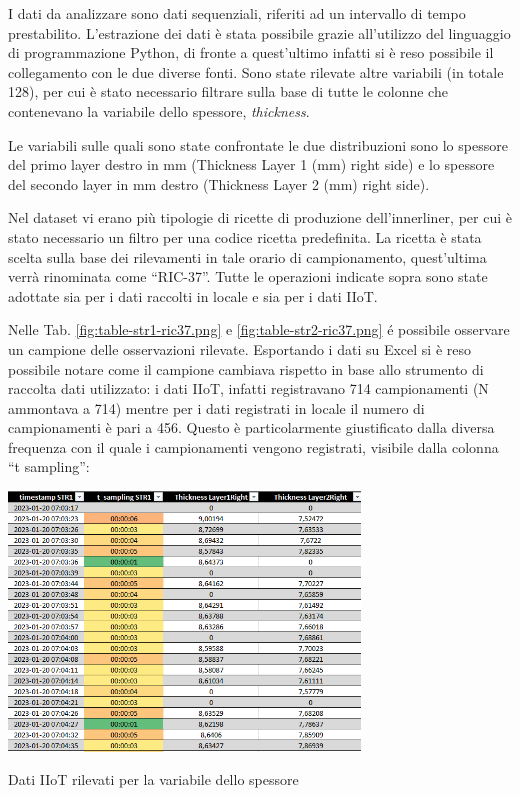 I dati da analizzare sono dati sequenziali, riferiti ad un intervallo di tempo prestabilito.
L'estrazione dei dati è stata possibile grazie all'utilizzo del linguaggio di programmazione Python, di fronte a quest'ultimo infatti si è reso possibile il collegamento con le due diverse fonti.
Sono state rilevate altre variabili (in totale 128), per cui è stato necessario filtrare sulla base di tutte le colonne che contenevano la variabile dello spessore, \textit{thickness}.

Le variabili sulle quali sono state confrontate le due distribuzioni sono lo spessore del primo layer destro in mm (Thickness Layer 1 (mm) right side) e lo spessore del secondo layer in mm destro (Thickness Layer 2 (mm) right side).

Nel dataset vi erano più tipologie di ricette di produzione dell'innerliner, per cui è stato necessario un filtro per una codice ricetta predefinita. 
La ricetta è stata scelta sulla base dei rilevamenti in tale orario di campionamento, quest'ultima verrà rinominata come ``RIC-37''.
Tutte le operazioni indicate sopra sono state adottate sia per i dati raccolti in locale e sia per i dati IIoT.


Nelle Tab. \ref{fig:table-str1-ric37.png}  e \ref{fig:table-str2-ric37.png} é possibile osservare un campione delle osservazioni rilevate.
Esportando i dati su Excel si è reso possibile notare come il campione cambiava rispetto in base allo strumento di raccolta dati utilizzato: i dati IIoT, infatti registravano 714 campionamenti (N ammontava a 714) mentre per i dati registrati in locale il numero di campionamenti è pari a 456.
Questo è particolarmente giustificato dalla diversa frequenza con il quale i campionamenti vengono registrati, visibile dalla colonna ``t sampling'':

\begin{table}[h]
  \centering
  \includegraphics[width=0.7\textwidth]{img/table-str1-ric37.png}
  \caption{Dati IIoT rilevati per la variabile dello spessore}
  \label{fig:table-str1-ric37.png}
\end{table}

